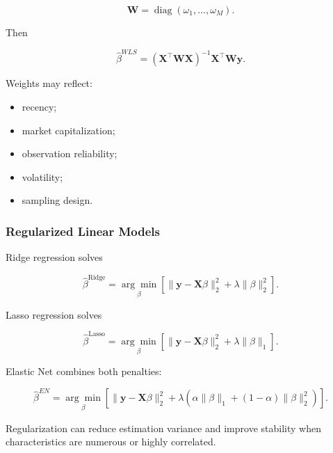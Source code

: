 \documentclass[11pt,a4paper]{article}
\begin{document}
\begin{equation}
\mathbf{W}
=
\operatorname{diag}
\left(
\omega_1,\ldots,\omega_M
\right).
\end{equation}

Then

\begin{equation}
\boxed{
\widehat{\beta}^{WLS}
=
\left(
\mathbf{X}^{\top}
\mathbf{W}
\mathbf{X}
\right)^{-1}
\mathbf{X}^{\top}
\mathbf{W}
\mathbf{y}.
}
\end{equation}

Weights may reflect:

\begin{itemize}
    \item recency;
    \item market capitalization;
    \item observation reliability;
    \item volatility;
    \item sampling design.
\end{itemize}


\subsubsection{Regularized Linear Models}

Ridge regression solves

\begin{equation}
\boxed{
\widehat{\beta}^{\mathrm{Ridge}}
=
\underset{\beta}{\arg\min}
\left[
\|\mathbf{y}-\mathbf{X}\beta\|_2^2
+
\lambda
\|\beta\|_2^2
\right].
}
\end{equation}

Lasso regression solves

\begin{equation}
\boxed{
\widehat{\beta}^{\mathrm{Lasso}}
=
\underset{\beta}{\arg\min}
\left[
\|\mathbf{y}-\mathbf{X}\beta\|_2^2
+
\lambda
\|\beta\|_1
\right].
}
\end{equation}

Elastic Net combines both penalties:

\begin{equation}
\boxed{
\widehat{\beta}^{EN}
=
\underset{\beta}{\arg\min}
\left[
\|\mathbf{y}-\mathbf{X}\beta\|_2^2
+
\lambda
\left(
\alpha\|\beta\|_1
+
(1-\alpha)\|\beta\|_2^2
\right)
\right].
}
\end{equation}

Regularization can reduce estimation variance and improve stability when
characteristics are numerous or highly correlated.
\end{document}

